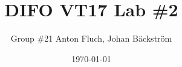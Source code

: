\documentclass{article}
\title{DIFO VT17 Lab \#2}
\author{Group \#21 Anton Fluch, Johan Bäckström}
\date{\today} %
\begin{document}
\maketitle
\thispagestyle{empty} %
\pagestyle{empty} %
\clearpage

\tableofcontents
\clearpage

\setcounter{page}{1}

\pagestyle{fancy}









\clearpage
\printbibliography
\clearpage




\lhead{}
\rhead{}

\begin{appendix}


\clearpage

\clearpage
\end{appendix}
\end{document}
